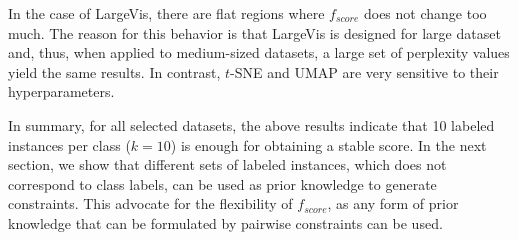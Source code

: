In the case of LargeVis, there are flat regions where $f_{score}$ does not change too much.
The reason for this behavior is that LargeVis is designed for large dataset and, thus, when applied to medium-sized datasets, a large set of perplexity values yield the same results.
In contrast, $t$-SNE and UMAP are very sensitive to their hyperparameters.

In summary, for all selected datasets, the above results indicate that 10 labeled instances per class ($k = 10$) is enough for obtaining a stable score. In the next section, we show that different sets of labeled instances, which does not correspond to class labels, can be used as prior knowledge to generate constraints. This advocate for the flexibility of $f_{score}$, as any form of prior knowledge that can be formulated by pairwise constraints can be used.

